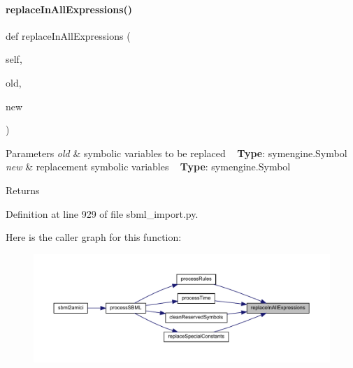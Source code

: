 \paragraph{\texorpdfstring{replaceInAllExpressions()}{replaceInAllExpressions()}}
{\footnotesize\ttfamily def replace\+In\+All\+Expressions (\begin{DoxyParamCaption}\item[{}]{self,  }\item[{}]{old,  }\item[{}]{new }\end{DoxyParamCaption})}


\begin{DoxyParams}{Parameters}
{\em old} & symbolic variables to be replaced ~\newline
{\bfseries{Type}}\+: symengine.\+Symbol\\
\hline
{\em new} & replacement symbolic variables ~\newline
{\bfseries{Type}}\+: symengine.\+Symbol\\
\hline
\end{DoxyParams}
\begin{DoxyReturn}{Returns}

\end{DoxyReturn}


Definition at line 929 of file sbml\+\_\+import.\+py.

Here is the caller graph for this function\+:
\nopagebreak
\begin{figure}[H]
\begin{center}
\leavevmode
\includegraphics[width=350pt]{classamici_1_1sbml__import_1_1_sbml_importer_a1579faf8b188de11ed58ddbebc3c20a7_icgraph}
\end{center}
\end{figure}
\mbox{\label{classamici_1_1sbml__import_1_1_sbml_importer_a122b9921e2fb5bd0fc75310c47413dd1}} 
